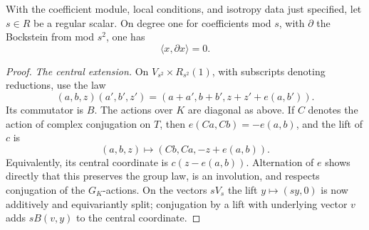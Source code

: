 \begin{lemma}\label{alternation-imaginary:alternation}
With the coefficient module, local conditions, and isotropy data just specified, let \(s\in R\) be a regular scalar. On degree one for coefficients mod \(s\), with \(\partial\) the Bockstein from mod \(s^2\), one has
\[
                           \langle x,\partial x\rangle=0 .             \tag{H1}\label{eq:H1}
\]
\end{lemma}
\begin{proof}
\emph{The central extension.}
On \(V_{s^2}\times R_{s^2}(1)\), with subscripts denoting reductions, use the law
\[
 (a,b,z)(a',b',z')
  =(a+a',b+b',z+z'+e(a,b')).
\]
Its commutator is \(B\). The actions over \(K\) are diagonal as above. If \(C\) denotes the action of complex conjugation on \(T\), then \(e(Ca,Cb)=-e(a,b)\), and the lift of \(c\) is
\[
 (a,b,z)\longmapsto(Cb,Ca,-z+e(a,b)).
\]
Equivalently, its central coordinate is \(c(z-e(a,b))\). Alternation of \(e\) shows directly that this preserves the group law, is an involution, and respects conjugation of the \(G_K\)-actions. On the vectors \(sV_s\) the lift \(y\mapsto(sy,0)\) is now additively and equivariantly split; conjugation by a lift with underlying vector \(v\) adds \(sB(v,y)\) to the central coordinate.


\end{proof}
